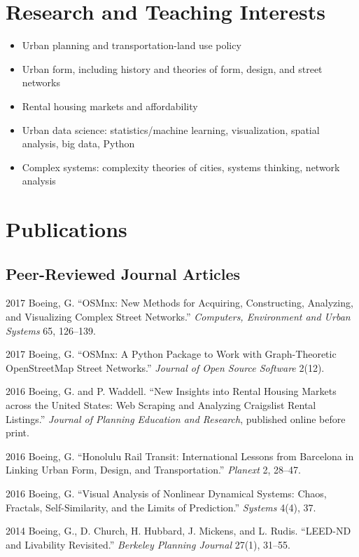 \documentclass{academiccv}
\begin{document}
\section*{Research and Teaching Interests}

\begin{itemize}
\item Urban planning and transportation-land use policy
\item Urban form, including history and theories of form, design, and street networks
\item Rental housing markets and affordability
\item Urban data science: statistics/machine learning, visualization, spatial analysis, big data, Python
\item Complex systems: complexity theories of cities, systems thinking, network analysis
\end{itemize}



\section*{Publications}

\subsection*{Peer-Reviewed Journal Articles}

\begin{tablist}

\item[2017] \tab Boeing, G. \enquote{OSMnx: New Methods for Acquiring, Constructing, Analyzing, and Visualizing Complex Street Networks.} \emph{Computers, Environment and Urban Systems} 65, 126--139.

\item[2017] \tab Boeing, G. \enquote{OSMnx: A Python Package to Work with Graph-Theoretic OpenStreetMap Street Networks.} \emph{Journal of Open Source Software} 2(12).

\item[2016] \tab Boeing, G. and P. Waddell. \enquote{New Insights into Rental Housing Markets across the United States: Web Scraping and Analyzing Craigslist Rental Listings.} \emph{Journal of Planning Education and Research}, published online before print.

\item[2016] \tab Boeing, G. \enquote{Honolulu Rail Transit: International Lessons from Barcelona in Linking Urban Form, Design, and Transportation.} \emph{Planext} 2, 28--47.

\item[2016] \tab Boeing, G. \enquote{Visual Analysis of Nonlinear Dynamical Systems: Chaos, Fractals, Self-Similarity, and the Limits of Prediction.} \emph{Systems} 4(4), 37.

\item[2014] \tab Boeing, G., D. Church, H. Hubbard, J. Mickens, and L. Rudis. \enquote{LEED-ND and Livability Revisited.} \emph{Berkeley Planning Journal} 27(1), 31--55.

\end{tablist}
\end{document}
